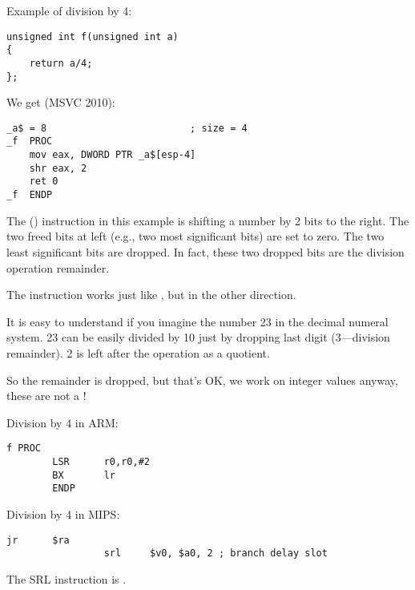 
\label{division_by_shifting}

Example of division by 4:

\begin{lstlisting}
unsigned int f(unsigned int a)
{
	return a/4;
};
\end{lstlisting}

We get (MSVC 2010):

\begin{lstlisting}[caption=MSVC 2010]
_a$ = 8							; size = 4
_f	PROC
	mov	eax, DWORD PTR _a$[esp-4]
	shr	eax, 2
	ret	0
_f	ENDP
\end{lstlisting}

\label{SHR}

The \SHR () instruction in this example is shifting a number by 2 bits to the right.
The two freed bits at left (e.g., two most significant bits) are set to zero.
The two least significant bits are dropped.
In fact, these two dropped bits are the division operation remainder.


The \SHR instruction works just like \SHL, but in the other direction.



It is easy to understand if you imagine the number 23 in the decimal numeral system.
23 can be easily divided by 10 just by dropping last digit (3---division remainder). 
2 is left after the operation as a \gls{quotient}.

So the remainder is dropped, but that's OK, we work on integer values anyway, 
these are not a !

Division by 4 in ARM:

\begin{lstlisting}[caption=\NonOptimizingKeilVI (\ARMMode)]
f PROC
        LSR      r0,r0,#2
        BX       lr
        ENDP
\end{lstlisting}

Division by 4 in MIPS:

\begin{lstlisting}[caption=\Optimizing GCC 4.4.5 (IDA)]
                 jr      $ra
                 srl     $v0, $a0, 2 ; branch delay slot
\end{lstlisting}

The SRL instruction is .
